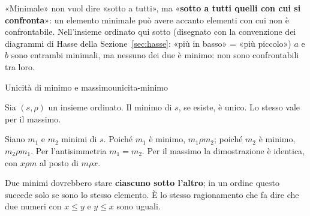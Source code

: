 \begin{spiegazione}
    «Minimale» non vuol dire «sotto a tutti», ma «\textbf{sotto a tutti quelli con cui si confronta}»: un elemento minimale può
    avere accanto elementi con cui non è confrontabile. Nell'insieme ordinato qui sotto (disegnato con la convenzione dei
    diagrammi di Hasse della Sezione~\ref{sec:hasse}: «più in basso» = «più piccolo») $a$ e $b$ sono entrambi minimali, ma
    nessuno dei due è minimo: non sono confrontabili tra loro.
    \begin{center}
    \end{center}
\end{spiegazione}

\begin{concetto}
\begin{Teorema}{Unicità di minimo e massimo}{unicita-minimo}
    \begin{prerequisiti}
    \end{prerequisiti}
    Sia $(s, \rho)$ un insieme ordinato. Il minimo di $s$, se esiste, è unico. Lo stesso vale per il massimo.
\end{Teorema}
\begin{dimostrazione}
    Siano $m_1$ e $m_2$ minimi di $s$. Poiché $m_1$ è minimo, $m_1 \rho m_2$; poiché $m_2$ è minimo, $m_2 \rho m_1$. Per l'antisimmetria
    $m_1 = m_2$. Per il massimo la dimostrazione è identica, con $x \rho m$ al posto di $m \rho x$.
\end{dimostrazione}
\end{concetto}

\begin{spiegazione}
    Due minimi dovrebbero stare \textbf{ciascuno sotto l'altro}; in un ordine questo succede solo se sono lo stesso elemento.
    È lo stesso ragionamento che fa dire che due numeri con $x \leq y$ e $y \leq x$ sono uguali.
\end{spiegazione}

